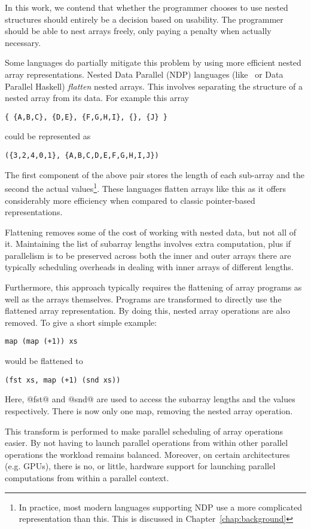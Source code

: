 In this work, we contend that whether the programmer chooses to use nested structures should entirely be a decision based on usability. The programmer should be able to nest arrays freely, only paying a penalty when actually necessary.

Some languages do partially mitigate this problem by using more efficient nested array representations. Nested Data Parallel (NDP) languages (like \nesl\  or Data Parallel Haskell) \emph{flatten} nested arrays. This involves separating the structure of a nested array from its data. For example this array
%
\begin{lstlisting}
{ {A,B,C}, {D,E}, {F,G,H,I}, {}, {J} }
\end{lstlisting}
%
could be represented as
%
\begin{lstlisting}
({3,2,4,0,1}, {A,B,C,D,E,F,G,H,I,J})
\end{lstlisting}
%
The first component of the above pair stores the length of each sub-array and the second the actual values\footnote{In practice, most modern languages supporting NDP use a more complicated representation than this. This is discussed in Chapter~\ref{chap:background}}. These languages flatten arrays like this as it offers considerably more efficiency when compared to classic pointer-based representations.

Flattening removes some of the cost of working with nested data, but not all of it. Maintaining the list of subarray lengths involves extra computation, plus if parallelism is to be preserved across both the inner and outer arrays there are typically scheduling overheads in dealing with inner arrays of different lengths.

Furthermore, this approach typically requires the flattening of array programs as well as the arrays themselves. Programs are transformed to directly use the flattened array representation. By doing this, nested array operations are also removed. To give a short simple example:
%
\begin{lstlisting}
map (map (+1)) xs
\end{lstlisting}
%
would be flattened to
%
\begin{lstlisting}
(fst xs, map (+1) (snd xs))
\end{lstlisting}
%
Here, @fst@ and @snd@ are used to access the subarray lengths and the values respectively. There is now only one map, removing the nested array operation.

This transform is performed to make parallel scheduling of array operations easier. By not having to launch parallel operations from within other parallel operations the workload remains balanced. Moreover, on certain architectures (e.g. GPUs), there is no, or little, hardware support for launching parallel computations from within a parallel context.

